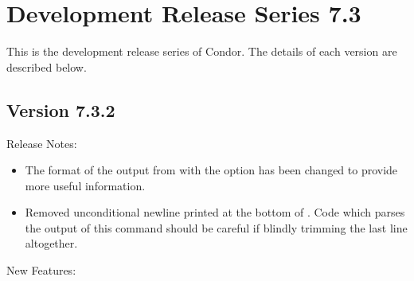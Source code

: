 
\section{\label{sec:History-7-3}Development Release Series 7.3}

This is the development release series of Condor.
The details of each version are described below.

\subsection*{\label{sec:New-7-3-2}Version 7.3.2}

\noindent Release Notes:

\begin{itemize}

\item The format of the output from  with the  option
has been changed to provide more useful information.

\item Removed unconditional newline printed at the bottom of 
. Code which parses the output of this command should be careful
if blindly trimming the last line altogether.

\end{itemize}

\noindent New Features:

